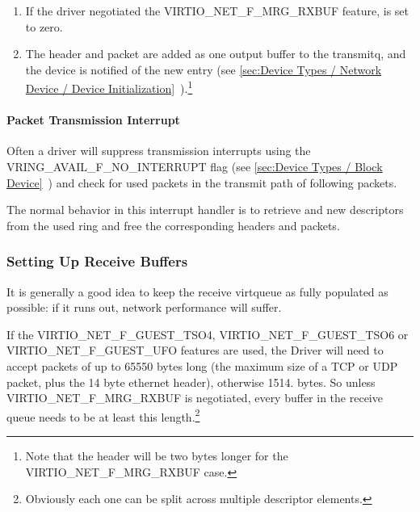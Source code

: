 \begin{enumerate}
\begin{itemize}
  \item If the driver negotiated the VIRTIO_NET_F_HOST_ECN feature,
    the VIRTIO_NET_HDR_GSO_ECN bit may be set in  as
    well, indicating that the TCP packet has the ECN bit set.\footnote{This case is not handled by some older hardware, so is called out
specifically in the protocol.
}
   \end{itemize}

\item If the driver negotiated the VIRTIO_NET_F_MRG_RXBUF feature,
   is set to zero.

\item The header and packet are added as one output buffer to the
  transmitq, and the device is notified of the new entry
  (see \ref{sec:Device Types / Network Device / Device Initialization}~).\footnote{Note that the header will be two bytes longer for the
VIRTIO_NET_F_MRG_RXBUF case.
}
\end{enumerate}

\paragraph{Packet Transmission Interrupt}\label{sec:Device Types / Network Device / Device Operation / Packet Transmission / Packet Transmission Interrupt}

Often a driver will suppress transmission interrupts using the
VRING_AVAIL_F_NO_INTERRUPT flag
 (see \ref{sec:Device Types / Block Device}~)
and check for used packets in the transmit path of following
packets.

The normal behavior in this interrupt handler is to retrieve and
new descriptors from the used ring and free the corresponding
headers and packets.

\subsubsection{Setting Up Receive Buffers}\label{sec:Device Types / Network Device / Device Operation / Setting Up Receive Buffers}

It is generally a good idea to keep the receive virtqueue as
fully populated as possible: if it runs out, network performance
will suffer.

If the VIRTIO_NET_F_GUEST_TSO4, VIRTIO_NET_F_GUEST_TSO6 or
VIRTIO_NET_F_GUEST_UFO features are used, the Driver will need to
accept packets of up to 65550 bytes long (the maximum size of a
TCP or UDP packet, plus the 14 byte ethernet header), otherwise
1514. bytes. So unless VIRTIO_NET_F_MRG_RXBUF is negotiated, every
buffer in the receive queue needs to be at least this length.\footnote{Obviously each one can be split across multiple descriptor
elements.
}


